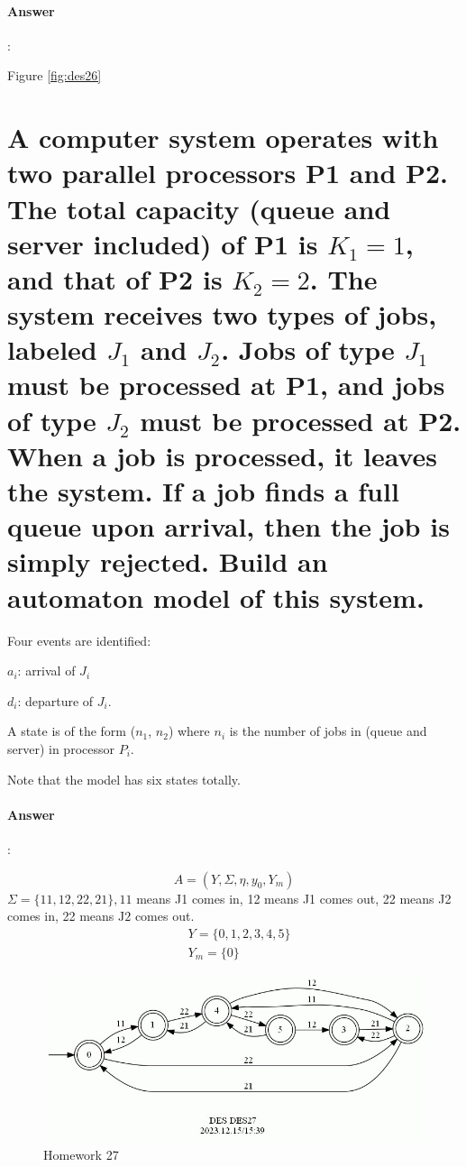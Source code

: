 \documentclass{article}
\begin{document}
\paragraph{Answer}:



Figure \ref{fig:des26}

\section{A computer system operates with two parallel processors P1 and P2. The total capacity (queue and server included) of P1 is $K_1 = 1$, and that of P2 is $K_2 = 2$. The system receives two types of jobs, labeled $J_1$ and $J_2$. Jobs of type $J_1$ must be processed at P1, and jobs of type $J_2$ must be processed at P2. When a job is processed, it leaves the system. If a job finds a full queue upon arrival, then the job is simply rejected. Build an automaton model of this system.}

\begin{tcolorbox}
  Four events are identified: 
  
  $a_i$: arrival of $J_i$ 

  $d_i$: departure of $J_i$.
  
  A state is of the form ($n_1$, $n_2$) where $n_i$ is the number of jobs in (queue and server) in processor $P_i$. 
  
  Note that the model has six states totally.
\end{tcolorbox}

\paragraph{Answer}: 


$$
A=\left(Y, \Sigma, \eta, y_0, Y_m\right)
$$
$\Sigma=\{11,12,22,21\}, 11$ means J1 comes in, 12 means J1 comes out, 22 means J2 comes in, 22 means $\mathrm{J} 2$ comes out.
$$
\begin{aligned}
& Y=\{0,1,2,3,4,5\} \\
& Y_m=\{0\}
\end{aligned}
$$



\begin{figure}[h]
  \centering
  \includegraphics[width=\textwidth]{assets/DES27.jpg}
  \caption{Homework 27}
  \label{fig:des27}
\end{figure}
\end{document}
